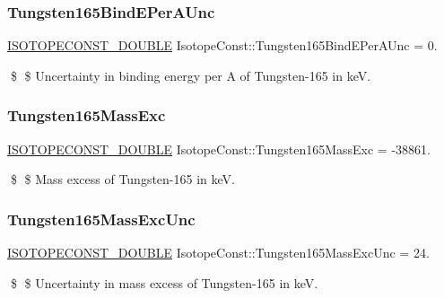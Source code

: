 \subsubsection{\texorpdfstring{Tungsten165\+Bind\+E\+Per\+A\+Unc}{Tungsten165BindEPerAUnc}}
{\footnotesize\ttfamily \mbox{\hyperlink{group___isotope_const-_macros_ga8f45a7272ce02c0b4c65c44636ed719a}{I\+S\+O\+T\+O\+P\+E\+C\+O\+N\+S\+T\+\_\+\+D\+O\+U\+B\+LE}} Isotope\+Const\+::\+Tungsten165\+Bind\+E\+Per\+A\+Unc = 0.}

\$ \$ Uncertainty in binding energy per A of Tungsten-\/165 in keV. \mbox{\label{group___isotope_const-_tungsten-_w165_gae74df146ada85b80fc18d752b36d4467}} 
\subsubsection{\texorpdfstring{Tungsten165\+Mass\+Exc}{Tungsten165MassExc}}
{\footnotesize\ttfamily \mbox{\hyperlink{group___isotope_const-_macros_ga8f45a7272ce02c0b4c65c44636ed719a}{I\+S\+O\+T\+O\+P\+E\+C\+O\+N\+S\+T\+\_\+\+D\+O\+U\+B\+LE}} Isotope\+Const\+::\+Tungsten165\+Mass\+Exc = -\/38861.}

\$ \$ Mass excess of Tungsten-\/165 in keV. \mbox{\label{group___isotope_const-_tungsten-_w165_gadcdb9a1b4d98416283719b7b3c5f9b6b}} 
\subsubsection{\texorpdfstring{Tungsten165\+Mass\+Exc\+Unc}{Tungsten165MassExcUnc}}
{\footnotesize\ttfamily \mbox{\hyperlink{group___isotope_const-_macros_ga8f45a7272ce02c0b4c65c44636ed719a}{I\+S\+O\+T\+O\+P\+E\+C\+O\+N\+S\+T\+\_\+\+D\+O\+U\+B\+LE}} Isotope\+Const\+::\+Tungsten165\+Mass\+Exc\+Unc = 24.}

\$ \$ Uncertainty in mass excess of Tungsten-\/165 in keV. \mbox{\label{group___isotope_const-_tungsten-_w165_ga9dfba542815fd70dcbc8b08f515cfa61}} 
